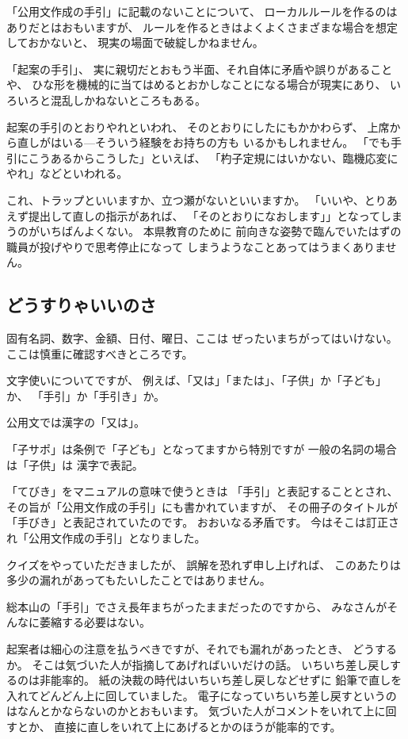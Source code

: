 \documentclass[uplatex,jis2004,dvipdfmx,12pt]{jsarticle}
\begin{document}
「公用文作成の手引」に記載のないことについて、
ローカルルールを作るのはありだとはおもいますが、
ルールを作るときはよくよくさまざまな場合を想定しておかないと、
現実の場面で破綻しかねません。

「起案の手引」、
実に親切だとおもう半面、それ自体に矛盾や誤りがあることや、
ひな形を機械的に当てはめるとおかしなことになる場合が現実にあり、
いろいろと混乱しかねないところもある。

起案の手引のとおりやれといわれ、
そのとおりにしたにもかかわらず、
上席から直しがはいる---そういう経験をお持ちの方も
いるかもしれません。
「でも手引にこうあるからこうした」といえば、
「杓子定規にはいかない、臨機応変にやれ」などといわれる。

これ、トラップといいますか、立つ瀬がないといいますか。
「いいや、とりあえず提出して直しの指示があれば、
「そのとおりになおします」」となってしまうのがいちばんよくない。
本県教育のために
前向きな姿勢で臨んでいたはずの職員が投げやりで思考停止になって
しまうようなことあってはうまくありません。

\subsection{どうすりゃいいのさ}

固有名詞、数字、金額、日付、曜日、ここは
ぜったいまちがってはいけない。
ここは慎重に確認すべきところです。

文字使いについてですが、
例えば、「又は」「または」、「子供」か「子ども」か、
「手引」か「手引き」か。


公用文では漢字の「又は」。

「子サポ」は条例で「子ども」となってますから特別ですが
一般の名詞の場合は「子供」は
漢字で表記。



「てびき」をマニュアルの意味で使うときは
「手引」と表記することとされ、
その旨が「公用文作成の手引」にも書かれていますが、
その冊子のタイトルが「手びき」と表記されていたのです。
おおいなる矛盾です。
今はそこは訂正され「公用文作成の手引」となりました。


クイズをやっていただきましたが、
誤解を恐れず申し上げれば、
このあたりは
多少の漏れがあってもたいしたことではありません。

総本山の「手引」でさえ長年まちがったままだったのですから、
みなさんがそんなに萎縮する必要はない。


起案者は細心の注意を払うべきですが、それでも漏れがあったとき、
どうするか。
そこは気づいた人が指摘してあげればいいだけの話。
いちいち差し戻しするのは非能率的。
紙の決裁の時代はいちいち差し戻しなどせずに
鉛筆で直しを入れてどんどん上に回していました。
電子になっていちいち差し戻すというのはなんとかならないのかとおもいます。
気づいた人がコメントをいれて上に回すとか、
直接に直しをいれて上にあげるとかのほうが能率的です。
\end{document}
